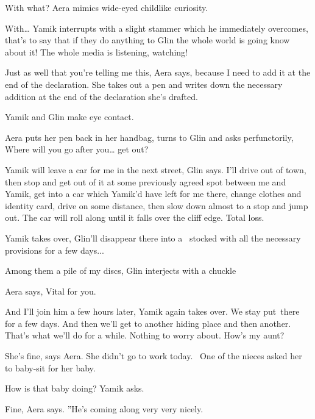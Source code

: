 \documentclass[letterpaper]{article}
\begin{document}
{\textquotedbl}With what?{\textquotedbl} Aera mimics wide-eyed childlike curiosity.

{\textquotedbl}With{\dots}{\textquotedbl} Yamik interrupts with a slight stammer which he immediately overcomes,
{\textquotedbl}that's to say that if they do anything to Glin the whole world is going know about it! The whole media
is listening, watching!{\textquotedbl} 

{\textquotedbl}Just as well that you're telling me this,{\textquotedbl} Aera says, {\textquotedbl}because I need to add
it at the end of the declaration.{\textquotedbl} She takes out a pen and writes down the necessary addition at the end
of the declaration she's drafted. 

Yamik and Glin make eye contact. 

Aera puts her pen back in her handbag, turns to Glin and asks perfunctorily, {\textquotedbl}Where will you go after
you{\dots} get out?{\textquotedbl} 

{\textquotedbl}Yamik will leave a car for me in the next street,{\textquotedbl} Glin says. {\textquotedbl}I'll drive out
of town, then stop and get out of it at some previously agreed spot between me and Yamik, get into a car which Yamik'd
have left for me there, change clothes and identity card, drive on some distance, then slow down almost to a stop and
jump out. The car will roll along until it falls over the cliff edge. Total loss.{\textquotedbl} 

Yamik takes over, {\textquotedbl}Glin'll disappear there into a \ stocked with all the necessary provisions for a few
days...{\textquotedbl} 

{\textquotedbl}Among them a pile of my discs,{\textquotedbl} Glin interjects with a chuckle 

Aera says, {\textquotedbl}Vital for you.{\textquotedbl} 

{\textquotedbl}And I'll join him a few hours later,{\textquotedbl} Yamik again takes over. {\textquotedbl}We stay
put~there for a few days. And then we'll get to another hiding place and then another. That's what we'll do for a
while. Nothing to worry about. How's my aunt?{\textquotedbl} 

{\textquotedbl}She's fine,{\textquotedbl} says Aera. {\textquotedbl}She didn't go to work today.~ One of the nieces
asked her to baby-sit for her baby.{\textquotedbl} 

{\textquotedbl}How is that baby doing?{\textquotedbl} Yamik asks. 

{\textquotedbl}Fine,{\textquotedbl} Aera says. ''He's coming along very very nicely.{\textquotedbl} 
\end{document}
